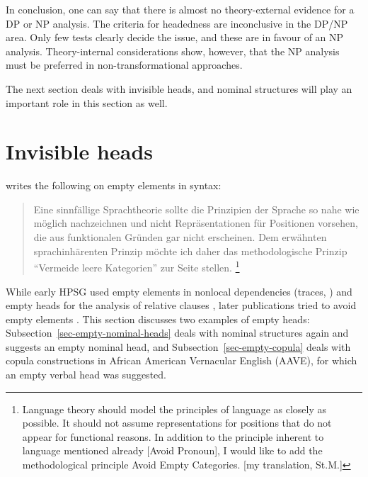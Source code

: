 \documentclass[output=paper
  ,nobabel
  ,draftmode
  ,uniformtopskip %
  ,colorlinks, citecolor=brown
]{langscibook}
\begin{document}
\largerpage%
In conclusion, one can say that there is almost no theory-external evidence for a DP or NP analysis. The
criteria for headedness are inconclusive in the DP/NP area. Only few tests clearly decide
the issue, and these are in favour of an NP analysis. Theory-internal considerations show, however, that
the NP analysis must be preferred in non-transformational approaches. 




The next section deals with invisible heads, and nominal structures will play an important role in
this section as well.


\section{Invisible heads}
\label{sec-unsichtbar}

\citet[]{Wunderlich87d} writes the following on empty elements in syntax:
\begin{quote}
\label{page-wunderlich-on-empty-elements}
Eine sinnfällige Sprachtheorie sollte die Prinzipien der Sprache so nahe wie möglich nachzeichnen
und nicht Repräsentationen für Positionen vorsehen, die aus funktionalen Gründen gar nicht
erscheinen. Dem erwähnten sprachinhärenten Prinzip möchte ich daher das methodologische Prinzip
"`Vermeide leere Kategorien"' zur Seite stellen.
\citep[]{Wunderlich87d}\footnote{%
Language theory should model the principles of language as closely as possible. It should not assume
representations for positions that do not appear for functional reasons. In addition to the
principle inherent to language mentioned already [Avoid Pronoun], I would like to add the
methodological principle Avoid Empty Categories. [my translation, St.M.]
}
\end{quote}
While early HPSG used empty elements in nonlocal dependencies (traces, \citealp[]{ps2}) and empty heads for the
analysis of relative clauses \citep[]{ps2}, later publications tried to avoid empty elements
\citep*{SF94a,Sag97a,BMS2001a}. This section discusses two examples of empty heads: Subsection~\ref{sec-empty-nominal-heads} deals
with nominal structures again and suggests an empty nominal head, and
Subsection~\ref{sec-empty-copula} deals with copula constructions in African American
  Vernacular English (AAVE), for which an empty verbal head was suggested. 
\end{document}
